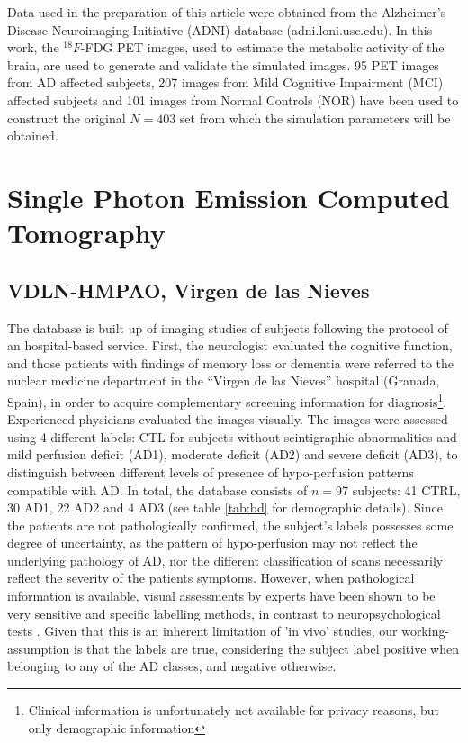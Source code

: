 Data used in the preparation of this article were obtained from the Alzheimer's Disease Neuroimaging Initiative (ADNI) database (adni.loni.usc.edu). In this work, the $^{18}F$-FDG PET images, used to estimate the metabolic activity of the brain, are used to generate and validate the simulated images. 95 PET images from AD affected subjects,  207 images from Mild Cognitive Impairment (MCI) affected subjects and 101 images from Normal Controls (NOR) have been used to construct the original $N=403$ set from which the simulation parameters will be obtained. 
\section{Single Photon Emission Computed Tomography}

\subsection{VDLN-HMPAO, Virgen de las Nieves}\label{sec:vdlnhmpao}
The database is built up of imaging studies of subjects following the protocol of an hospital-based service. First, the neurologist evaluated the cognitive function, and those patients with findings of memory loss or dementia were referred to the nuclear medicine department in the ``Virgen de las Nieves'' hospital (Granada, Spain), in order to acquire complementary screening information for diagnosis\footnote{Clinical information is unfortunately not available for privacy reasons, but only demographic  information}. Experienced physicians evaluated the images visually. The images were assessed using 4 different labels: \ac{CTL} for subjects without scintigraphic abnormalities and mild perfusion deficit (AD1), moderate deficit (AD2) and severe deficit (AD3), to distinguish between different levels of presence of hypo-perfusion patterns compatible with AD. In total, the database consists of $n=$97 subjects: 41 CTRL, 30 AD1, 22 AD2 and 4 AD3 (see table \ref{tab:bd} for demographic details). Since the patients are not pathologically confirmed, the subject's labels possesses some degree of uncertainty, as the pattern of hypo-perfusion may not reflect the underlying pathology of AD, nor the different classification of scans necessarily reflect the severity of the patients symptoms. However, when pathological information is available, visual assessments by experts have been shown to be very sensitive and specific labelling methods, in contrast to neuropsychological tests \cite{jobst_accurate_1998,dougall_systematic_2004}. Given that this is an inherent limitation of 'in vivo' studies, our working-assumption is that the labels are true, considering the subject label positive when belonging to any of the AD classes, and negative otherwise. 

